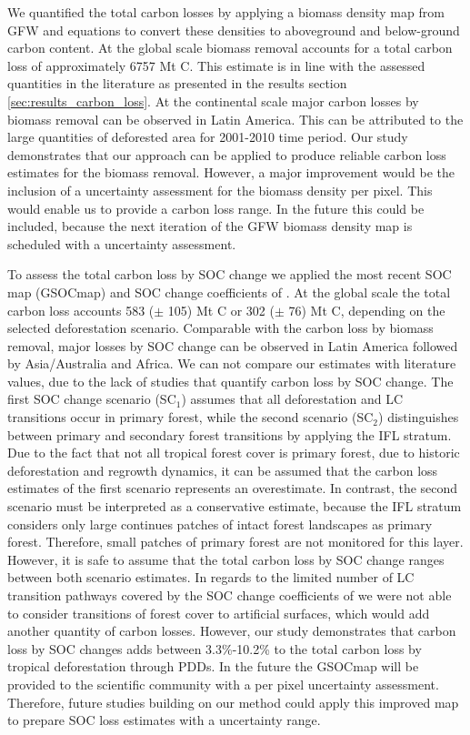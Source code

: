		We quantified the total carbon losses by applying a biomass density map from \ac{GFW} and equations to convert these densities to aboveground and below-ground carbon content. At the global scale biomass removal accounts for a total carbon loss of approximately 6757 Mt C. This estimate is in line with the assessed quantities in the literature as presented in the results section \ref{sec:results_carbon_loss}. At the continental scale major carbon losses by biomass removal can be observed in Latin America. This can be attributed to the large quantities of deforested area for 2001-2010 time period. Our study demonstrates that our approach can be applied to produce reliable carbon loss estimates for the biomass removal. However, a major improvement would be the inclusion of a uncertainty assessment for the biomass density per pixel. This would enable us to provide a carbon loss range. In the future this could be included, because the next iteration of the \ac{GFW} biomass density map is scheduled with a uncertainty assessment. 

		To assess the total carbon loss by \ac{SOC} change we applied the most recent \ac{SOC} map (\ac{GSOCmap}) and \ac{SOC} change coefficients of \citet{Don2010}. At the global scale the total carbon loss accounts 583 ($\pm$ 105) Mt C or 302 ($\pm$ 76) Mt C, depending on the selected deforestation scenario. Comparable with the carbon loss by biomass removal, major losses by \ac{SOC} change can be observed in Latin America followed by Asia/Australia and Africa. We can not compare our estimates with literature values, due to the lack of studies that quantify carbon loss by \ac{SOC} change. The first \ac{SOC} change scenario (SC$_1$) assumes that all deforestation and \ac{LC} transitions occur in primary forest, while the second scenario (SC$_2$) distinguishes between primary and secondary forest transitions by applying the \ac{IFL} stratum. Due to the fact that not all tropical forest cover is primary forest, due to historic deforestation and regrowth dynamics, it can be assumed that the carbon loss estimates of the first scenario represents an overestimate. In contrast, the second scenario must be interpreted as a conservative estimate, because the \ac{IFL} stratum considers only large continues patches of intact forest landscapes as primary forest. Therefore, small patches of primary forest are not monitored for this layer. However, it is safe to assume that the total carbon loss by \ac{SOC} change ranges between both scenario estimates. In regards to the limited number of \ac{LC} transition pathways covered by the \ac{SOC} change coefficients of \citep{Don2010} we were not able to consider transitions of forest cover to artificial surfaces, which would add another quantity of carbon losses. However, our study demonstrates that carbon loss by \ac{SOC} changes adds between 3.3\%-10.2\% to the total carbon loss by tropical deforestation through \acp{PDD}. In the future the \ac{GSOCmap} will be provided to the scientific community with a per pixel uncertainty assessment. Therefore, future studies building on our method could apply this improved map to prepare \ac{SOC} loss estimates with a uncertainty range.

